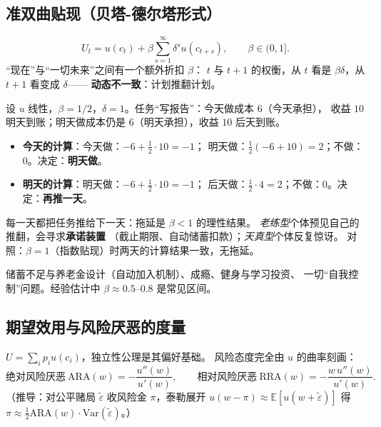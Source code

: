 \subsection{准双曲贴现（贝塔-德尔塔形式）}\label{subsec:betadelta}

\[
U_t=u(c_t)+\beta\sum_{s=1}^{\infty}\delta^{s}u(c_{t+s}),\qquad \beta\in(0,1].
\]
“现在”与“一切未来”之间有一个额外折扣 $\beta$：
$t$ 与 $t+1$ 的权衡，从 $t$ 看是 $\beta\delta$，从 $t+1$ 看变成 $\delta$——
\textbf{动态不一致}：计划推翻计划。

设 $u$ 线性，$\beta=1/2$，$\delta=1$。任务“写报告”：今天做成本 $6$（今天承担），
收益 $10$ 明天到账；明天做成本仍是 $6$（明天承担），收益 $10$ 后天到账。
\begin{itemize}
  \item \textbf{今天的计算}：今天做：$-6+\frac12\cdot10=-1$；
        明天做：$\frac12(-6+10)=2$；不做：$0$。决定：\textbf{明天做}。
  \item \textbf{明天的计算}：明天做：$-6+\frac12\cdot10=-1$；
        后天做：$\frac12\cdot4=2$；不做：$0$。决定：\textbf{再推一天}。
\end{itemize}
每一天都把任务推给下一天：拖延是 $\beta<1$ 的理性结果。
\textit{老练型}个体预见自己的推翻，会寻求\textbf{承诺装置}
（截止期限、自动储蓄扣款）；\textit{天真型}个体反复惊讶。
对照：$\beta=1$（指数贴现）时两天的计算结果一致，无拖延。

储蓄不足与养老金设计（自动加入机制）、成瘾、健身与学习投资、
一切“自我控制”问题。经验估计中 $\beta\approx0.5$--$0.8$ 是常见区间。

\subsection{期望效用与风险厌恶的度量}\label{subsec:risk}

$U=\sum_i p_i u(c_i)$，独立性公理是其偏好基础。
风险态度完全由 $u$ 的曲率刻画：
\[
\text{绝对风险厌恶}\ \mathrm{ARA}(w)=-\frac{u''(w)}{u'(w)},\qquad
\text{相对风险厌恶}\ \mathrm{RRA}(w)=-\frac{w\,u''(w)}{u'(w)}.
\]
（推导：对公平赌局 $\tilde\varepsilon$ 收风险金 $\pi$，泰勒展开
$u(w-\pi)\approx\mathbb{E}[u(w+\tilde\varepsilon)]$ 得
$\pi\approx\frac{1}{2}\mathrm{ARA}(w)\cdot\mathrm{Var}(\tilde\varepsilon)$。）


